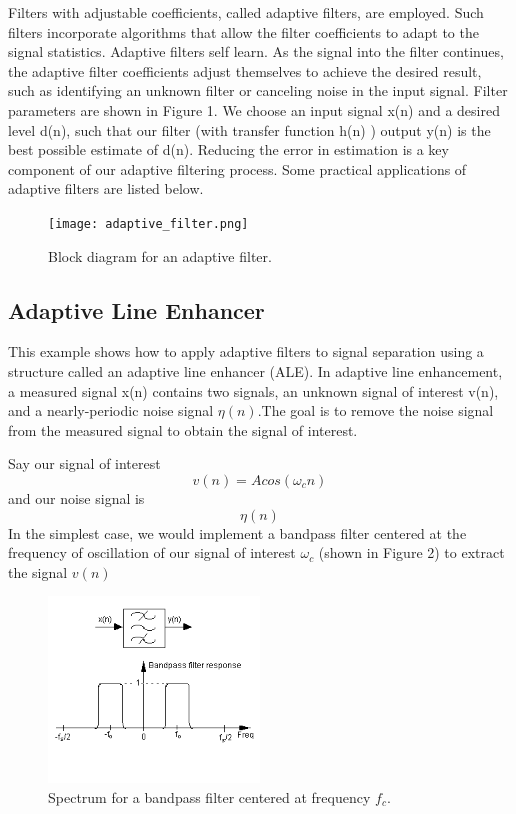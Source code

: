 Filters with adjustable coefficients, called adaptive filters, are employed. Such filters incorporate algorithms that allow the filter coefficients to adapt to the signal statistics. Adaptive filters self learn. As the signal into the filter continues, the adaptive filter coefficients adjust themselves to achieve the desired result, such as identifying an unknown filter or canceling noise in the input signal. Filter parameters are shown in Figure 1. We choose an input signal x(n) and a desired level d(n), such that our filter (with transfer function h(n) ) output y(n) is the best possible estimate of d(n). Reducing the error in estimation is a key component of our adaptive filtering process.
Some practical applications of adaptive filters are listed below.
\begin{figure}[!ht]
\centering
\texttt{[image: adaptive\_filter.png]}
\caption{\label{fig:adaptive_filter}Block diagram for an adaptive filter.}
\end{figure}

\subsection{Adaptive Line Enhancer}
This example shows how to apply adaptive filters to signal separation using a structure called an adaptive line enhancer (ALE). In adaptive line enhancement, a measured signal x(n) contains two signals, an unknown signal of interest v(n), and a nearly-periodic noise signal $\eta(n)$.The goal is to remove the noise signal from the measured signal to obtain the signal of interest. 

Say our signal of interest $$v(n)= Acos(\omega_cn)$$ and our noise signal is $$\eta(n)$$In the simplest case, we would implement a bandpass filter centered at the frequency of oscillation of our signal of interest $\omega_c$ (shown in Figure 2) to extract the signal $v(n)$

\begin{figure}[!ht]
\centering
\includegraphics[width=0.5\textwidth]{bandpass_filter.png}
\caption{\label{fig:bandpass_filter}Spectrum for a bandpass filter centered at frequency $f_c$.}
\end{figure}

